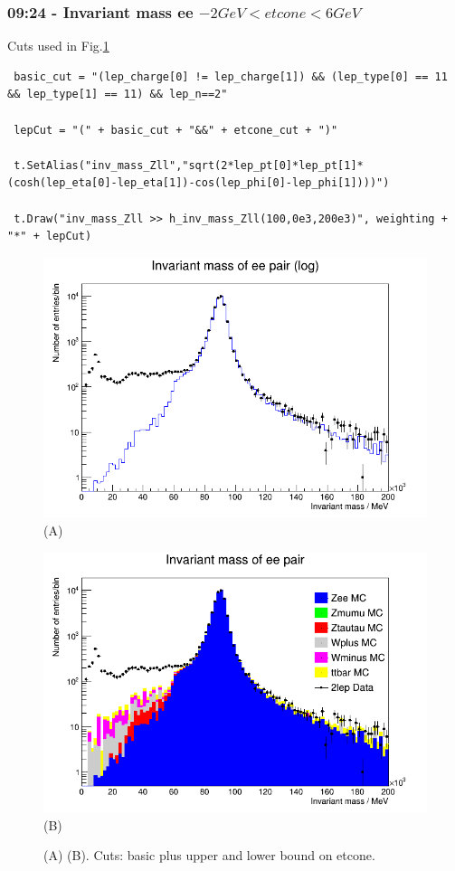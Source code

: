 \subsubsection*{09:24 - Invariant mass ee $-2 GeV < etcone < 6 GeV $}
Cuts used in Fig.\ref{fig:09:24_02-03-21}
\begin{lstlisting}
 basic_cut = "(lep_charge[0] != lep_charge[1]) && (lep_type[0] == 11 && lep_type[1] == 11) && lep_n==2"
 
 lepCut = "(" + basic_cut + "&&" + etcone_cut + ")"

 t.SetAlias("inv_mass_Zll","sqrt(2*lep_pt[0]*lep_pt[1]*(cosh(lep_eta[0]-lep_eta[1])-cos(lep_phi[0]-lep_phi[1])))")
  
 t.Draw("inv_mass_Zll >> h_inv_mass_Zll(100,0e3,200e3)", weighting + "*" + lepCut)
\end{lstlisting}


\begin{figure}[h!]
    \centering
    \begin{minipage}{0.5\textwidth}
        \centering
        \includegraphics[width=\linewidth]{plots/02-03-2021/09-28_AllStack.png}
        (A)
    \end{minipage}\hfill
    \begin{minipage}{0.5\textwidth}
        \centering
        \includegraphics[width=\linewidth]{plots/02-03-2021/09-24_2Stack.png}
        (B)
    \end{minipage}
    \caption{(A)  (B). Cuts: basic plus upper and lower bound on etcone.}
    \label{fig:09:24_02-03-21}
\end{figure}


